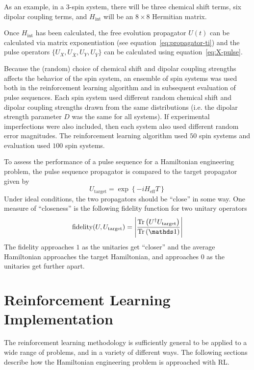 As an example, in a $3$-spin system, there will be three chemical shift terms, six dipolar coupling terms, and $H_{\text{int}}$ will be an $8
\times 8$ Hermitian matrix.

Once $H_{\text{int}}$ has been calculated, the free evolution propagator $U(t)$ can be calculated via matrix exponentiation (see equation~\ref{eq:propagator-ti})
and
the pulse operators $\{ U_X, U_{\overline{X}}, U_Y, U_{\overline{Y}} \}$ can be calculated using equation~\ref{eq:X-pulse}.

Because the (random) choice of chemical shift and dipolar coupling strengths affects the behavior of the spin system, an ensemble of spin systems was used both in the reinforcement learning algorithm and in subsequent evaluation of pulse sequences.
Each spin system used different random chemical shift and dipolar coupling strengths drawn from the same distributions (i.e. the dipolar strength parameter $D$ was the same for all systems). If experimental imperfections were also included, then each system also used different random error magnitudes.
The reinforcement learning algorithm used $50$ spin systems and evaluation used $100$ spin systems.

To assess the performance of a pulse sequence for a Hamiltonian engineering problem, the pulse sequence propagator is compared to the target propagator given by
\[
U_{\text{target}} = \exp\left\{ -i H_{\text{eff}} T \right\}
\]
Under ideal conditions, the two propagators should be ``close'' in some way. One measure of ``closeness'' is the following fidelity function for two unitary operators
\begin{equation}
    \text{fidelity}(U, U_\text{target}) = \left| \frac{\Tr{
        U^\dagger U_\text{target}
    }}{\Tr{\identity}} \right|
\end{equation}
The fidelity approaches $1$ as the unitaries get ``closer'' and the average Hamiltonian approaches the target Hamiltonian, and approaches $0$ as the unitaries get further apart.

\section{Reinforcement Learning Implementation}

The reinforcement learning methodology is sufficiently general to be applied to a wide range of problems, and in a variety of different ways.  The following sections describe how the Hamiltonian engineering problem is approached with RL.

